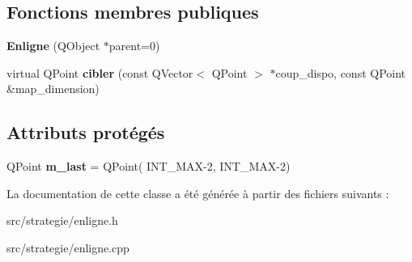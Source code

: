 \subsection*{Fonctions membres publiques}
\begin{DoxyCompactItemize}
\item 
{\bfseries Enligne} (Q\+Object $\ast$parent=0)\hypertarget{class_enligne_afaa0cfcd78b2b04e2ba6d5fe54ab371f}{}\label{class_enligne_afaa0cfcd78b2b04e2ba6d5fe54ab371f}

\item 
virtual Q\+Point {\bfseries cibler} (const Q\+Vector$<$ Q\+Point $>$ $\ast$coup\+\_\+dispo, const Q\+Point \&map\+\_\+dimension)\hypertarget{class_enligne_ab4935689fd3ca6a0d4a351929b120493}{}\label{class_enligne_ab4935689fd3ca6a0d4a351929b120493}

\end{DoxyCompactItemize}
\subsection*{Attributs protégés}
\begin{DoxyCompactItemize}
\item 
Q\+Point {\bfseries m\+\_\+last} = Q\+Point( I\+N\+T\+\_\+\+M\+AX-\/2, I\+N\+T\+\_\+\+M\+AX-\/2)\hypertarget{class_enligne_a7b15585630a7b29388900e30a2ed33fe}{}\label{class_enligne_a7b15585630a7b29388900e30a2ed33fe}

\end{DoxyCompactItemize}


La documentation de cette classe a été générée à partir des fichiers suivants \+:\begin{DoxyCompactItemize}
\item 
src/strategie/enligne.\+h\item 
src/strategie/enligne.\+cpp\end{DoxyCompactItemize}
